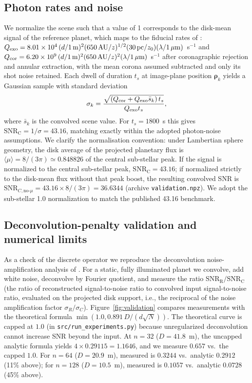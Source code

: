 \documentclass[twocolumn,10pt]{article}
\begin{document}
\subsection{Photon rates and noise}
We normalize the scene such that a value of 1 corresponds to the
disk-mean signal of the reference planet, which maps to the fiducial
rates of \citet{tt22mnras}:
$Q_{\rm exo}=8.01\times10^4\,(d/1\,{\rm m})^2(650\,{\rm AU}/z)^{1/2}
(30\,{\rm pc}/z_0)(\lambda/1\,\mu{\rm m})$~s$^{-1}$ and
$Q_{\rm cor}=6.20\times10^9\,(d/1\,{\rm m})^2(650\,{\rm AU}/z)^2
(\lambda/1\,\mu{\rm m})$~s$^{-1}$ after coronagraphic rejection and
annular extraction, with the mean corona assumed subtracted and only its
shot noise retained. Each dwell of duration $t_s$ at image-plane position
$\boldsymbol{\rho}_k$ yields a Gaussian sample with standard deviation
\begin{equation}
\sigma_k=\frac{\sqrt{(Q_{\rm cor}+Q_{\rm exo}\bar{s}_k)\,t_s}}
{Q_{\rm exo}t_s},
\label{eq:noise}
\end{equation}
where $\bar s_k$ is the convolved scene value. For $t_s=1800$~s this
gives $\mathrm{SNR_C}=1/\sigma=43.16$, matching \citet{tur26bench}
exactly within the adopted photon-noise assumptions.
We clarify the normalisation convention: under Lambertian sphere geometry, the disk average of the projected planetary flux is $\langle \mu \rangle = 8/(3\pi) \simeq 0.848826$ of the central sub-stellar peak. If the signal is normalized to the central sub-stellar peak, $\mathrm{SNR_C}=43.16$; if normalized strictly to the disk-mean flux without that peak boost, the resulting convolved SNR is $\mathrm{SNR}_{C,\mathrm{no}\text{-}\mu} = 43.16 \times 8/(3\pi) = 36.6344$ (archive \texttt{validation.npz}). We adopt the sub-stellar 1.0 normalization to match the published 43.16 benchmark.

\subsection{Deconvolution-penalty validation and numerical limits}
As a check of the discrete operator we reproduce the deconvolution
noise-amplification analysis of \citet{toth21}. For a static, fully
illuminated planet we convolve, add white noise, deconvolve by Fourier
quotient, and measure the ratio $\mathrm{SNR_R/SNR_C}$ (the ratio of
reconstructed signal-to-noise ratio to convolved input signal-to-noise ratio,
evaluated on the projected disk support, i.e., the reciprocal of the noise amplification factor $\sigma_R/\sigma_C$).
Figure~\ref{fig:validation} compares measurements with the theoretical formula
$\min(1.0, 0.891\,D/(d\sqrt{N}))$.
The theoretical curve is capped at $1.0$ (in \texttt{src/run\_experiments.py})
because unregularized deconvolution cannot increase SNR beyond the input.
At $n=32$ ($D=41.8$~m), the uncapped analytic formula yields $4\times0.29115=1.1646$,
and we measure $0.657$ vs.\ the capped $1.0$.
For $n=64$ ($D=20.9$~m), measured is $0.3244$ vs.\ analytic $0.2912$ (11\% above);
for $n=128$ ($D=10.5$~m), measured is $0.1057$ vs.\ analytic $0.0728$ (45\% above).
\end{document}

